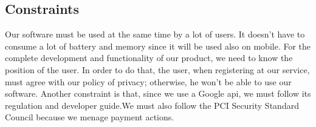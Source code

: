 
\subsection{Constraints} \label{subsec:constraints}
Our software must be used at the same time by a lot of users. It doesn't have to consume a lot of battery and memory since it will be used also on mobile. 
For the complete development and functionality of our product, we need to know the position of the user. In order to do that, the user, when registering at our service, must agree with our policy of privacy; otherwise, he won't be able to use our software.
Another constraint is that, since we use a Google \acs{api}, we must follow its regulation and developer guide.We must also follow the PCI Security Standard Council because we menage payment actions.


